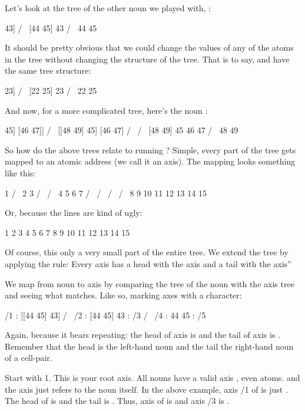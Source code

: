Let's look at the tree of the other noun we played with, \kode{[[44 45] 43]}:
\begin{code}
 [[44 45] 43]
    /      \
[44 45]    43
 /   \
44   45
\end{code}
It should be pretty obvious that we could change the values of any of the atoms
in the tree without changing the structure of the tree. That is to say, \kode{[[44
45] 43]} and \kode{[[24 25] 23]} have the same tree structure:
\begin{code}
 [[22 25] 23]
    /      \
[22 25]    23
 /   \
22   25
\end{code}
And now, for a more complicated tree, here's the noun \kode{[[[48 49] 45] [46 47]]}:
\begin{code}
  [[[48 49] 45] [46 47]]
       /            \
 [[48 49] 45]      [46 47]
   /       \        /   \
[48 49]    45      46   47
 /   \
48   49
\end{code}
So how do the above trees relate to running ? Simple, every part
of the tree gets mapped to an atomic address (we call it an axis). The mapping
looks something like this:
\begin{code}
           1 
       /       \
     2           3          
   /   \       /   \
  4     5     6     7     
 / \   / \   / \   / \
8   9 10 11 12 13 14 15

\end{code}
Or, because the lines are kind of ugly:
\begin{code}
         1
    2          3
 4    5     6     7
8 9 10 11 12 13 14 15
\end{code}
Of course, this only a very small part of the entire tree. We extend the tree
by applying the rule: Every axis  has a head with the axis and a tail
with the axis\kode{/2n+1}''

We map from noun to axis by comparing the tree of the noun with the axis tree
and seeing what matches. Like so, marking axes with a \kode{/} character:
\begin{code}
  /1 : [[44 45] 43]
         /        \
 /2 : [44 45]     43 : /3
      /     \
/4 : 44      45 : /5
\end{code}
Again, because it bears repeating: the head of axis  is  and the tail
of axis  is . Remember that the head is the left-hand noun and the
tail the right-hand noun of a cell-pair.

Start with 1. This is your root axis. All nouns have a valid axis , even
atoms. and the axis  just refers to the noun itself. In the above example,
axis /1 of \kode{[[44 45] 43]} is just \kode{[[44 45] 43]}. The head of \kode{[[44 45] 43]} is
\kode{[44 45]} and the tail is . Thus, axis  of \kode{[[44 45] 43]} is \kode{[44 45]}
and axis /3 is \kode{43}.

